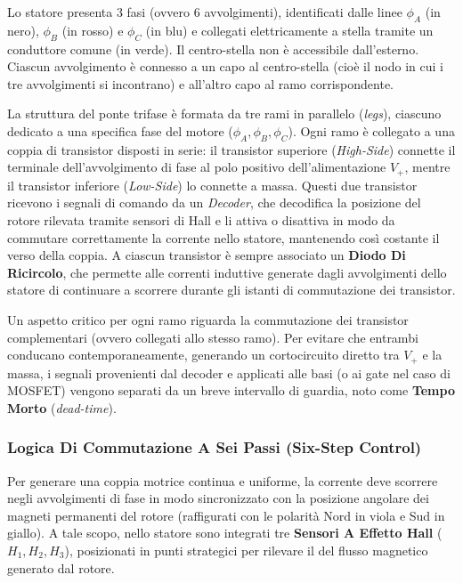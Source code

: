 ﻿\documentclass[11pt, a4paper]{article}
\begin{document}
Lo statore presenta 3 fasi (ovvero 6 avvolgimenti), identificati dalle linee $\phi_A$ (in nero), $\phi_B$ (in rosso) e $\phi_C$ (in blu) e collegati elettricamente a stella tramite un conduttore comune (in verde). Il centro-stella non è accessibile dall'esterno. Ciascun avvolgimento è connesso a un capo al centro-stella (cioè il nodo in cui i tre avvolgimenti si incontrano) e all'altro capo al ramo corrispondente.

La struttura del ponte trifase è formata da tre rami in parallelo (\textit{legs}), ciascuno dedicato a una specifica fase del motore ($\phi_A, \phi_B, \phi_C$). Ogni ramo è collegato a una coppia di transistor disposti in serie: il transistor superiore (\textit{High-Side}) connette il terminale dell'avvolgimento di fase al polo positivo dell'alimentazione $V_{+}$, mentre il transistor inferiore (\textit{Low-Side}) lo connette a massa. Questi due transistor ricevono i segnali di comando da un \textit{Decoder}, che decodifica la posizione del rotore rilevata tramite sensori di Hall e li attiva o disattiva in modo da commutare correttamente la corrente nello statore, mantenendo così costante il verso della coppia. A ciascun transistor è sempre associato un \textbf{Diodo Di Ricircolo}, che permette alle correnti induttive generate dagli avvolgimenti dello statore di continuare a scorrere durante gli istanti di commutazione dei transistor.

Un aspetto critico per ogni ramo riguarda la commutazione dei transistor complementari (ovvero collegati allo stesso ramo). Per evitare che entrambi conducano contemporaneamente, generando un cortocircuito diretto tra $V_+$ e la massa, i segnali provenienti dal decoder e applicati alle basi (o ai gate nel caso di MOSFET) vengono separati da un breve intervallo di guardia, noto come \textbf{Tempo Morto} (\textit{dead-time}).

\newpage

\subsubsection{Logica Di Commutazione A Sei Passi (Six-Step Control)}
Per generare una coppia motrice continua e uniforme, la corrente deve scorrere negli avvolgimenti di fase in modo sincronizzato con la posizione angolare dei magneti permanenti del rotore (raffigurati con le polarità Nord in viola e Sud in giallo). A tale scopo, nello statore sono integrati tre \textbf{Sensori A Effetto Hall} ($H_1, H_2, H_3$), posizionati in punti strategici per rilevare il del flusso magnetico generato dal rotore.
\end{document}
